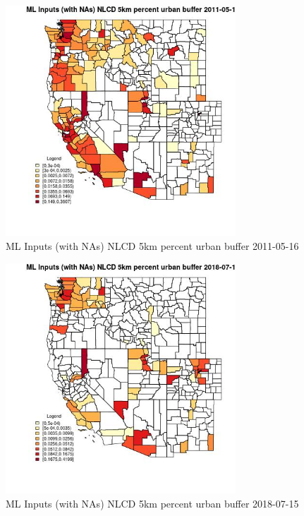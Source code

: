 \begin{figure} 
\centering  
\includegraphics[width=0.77\textwidth]{Code_Outputs/Report_ML_input_PM25_Step4_part_e_de_duplicated_aves_compiled_2019-05-21wNAs_CountyNLCD_5km_percent_urban_bufferMean2011-05-16.jpg} 
\caption{\label{fig:Report_ML_input_PM25_Step4_part_e_de_duplicated_aves_compiled_2019-05-21wNAsCountyNLCD_5km_percent_urban_bufferMean2011-05-16}ML Inputs (with NAs) NLCD 5km percent urban buffer 2011-05-16} 
\end{figure} 
 

\begin{figure} 
\centering  
\includegraphics[width=0.77\textwidth]{Code_Outputs/Report_ML_input_PM25_Step4_part_e_de_duplicated_aves_compiled_2019-05-21wNAs_CountyNLCD_5km_percent_urban_bufferMean2018-07-15.jpg} 
\caption{\label{fig:Report_ML_input_PM25_Step4_part_e_de_duplicated_aves_compiled_2019-05-21wNAsCountyNLCD_5km_percent_urban_bufferMean2018-07-15}ML Inputs (with NAs) NLCD 5km percent urban buffer 2018-07-15} 
\end{figure} 
 

